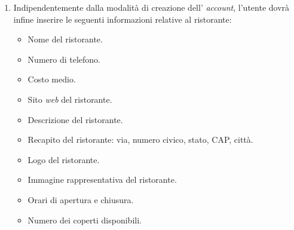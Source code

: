 \begin{itemize}
\begin{enumerate}
            \item Indipendentemente dalla modalità di creazione dell' \textit{account}, l'utente dovrà infine inserire le seguenti informazioni relative al ristorante:
                \begin{itemize}
                    \item Nome del ristorante.
                    \item Numero di telefono.
                    \item Costo medio.
                    \item Sito \textit{web} del ristorante.
                    \item Descrizione del ristorante.
                    \item Recapito del ristorante: via, numero civico, stato, CAP, città.
                    \item Logo del ristorante.
                    \item Immagine rappresentativa del ristorante.
                    \item Orari di apertura e chiusura.
                    \item Numero dei coperti disponibili.
                \end{itemize}
	\end{enumerate}
	
\end{itemize}